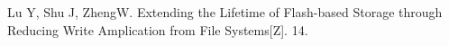 
\begin{translationbib}
\item Lu Y, Shu J, ZhengW. Extending the Lifetime of Flash-based Storage through Reducing Write Amplication from File Systems[Z]. 14.
\end{translationbib}
